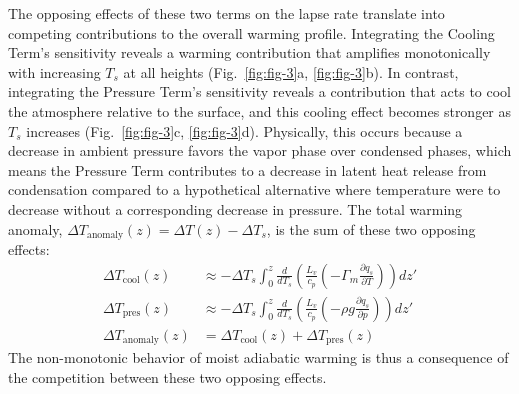 \documentclass{ametsocV6.1}
\begin{document}
The opposing effects of these two terms on the lapse rate translate into competing contributions to the overall warming profile. Integrating the Cooling Term's sensitivity reveals a warming contribution that amplifies monotonically with increasing $T_s$ at all heights (Fig.~\ref{fig:fig-3}a, \ref{fig:fig-3}b). In contrast, integrating the Pressure Term's sensitivity reveals a contribution that acts to cool the atmosphere relative to the surface, and this cooling effect becomes stronger as $T_s$ increases (Fig.~\ref{fig:fig-3}c, \ref{fig:fig-3}d). Physically, this occurs because a decrease in ambient pressure favors the vapor phase over condensed phases, which means the Pressure Term contributes to a decrease in latent heat release from condensation compared to a hypothetical alternative where temperature were to decrease without a corresponding decrease in pressure. The total warming anomaly, $\Delta T_{\text{anomaly}}(z)=\Delta T(z)-\Delta T_s$, is the sum of these two opposing effects:
\begin{align}
\Delta T_{\text{cool}}(z) &\approx - \Delta T_s \int_0^z \frac{d}{dT_s}\left(\frac{L_v}{c_p}\left(-\Gamma_m \frac{\partial q_s}{\partial T}\right)\right) dz' \label{eq:delta_t_cool} \\
\Delta T_{\text{pres}}(z) &\approx - \Delta T_s \int_0^z \frac{d}{dT_s}\left(\frac{L_v}{c_p}\left(-\rho g \frac{\partial q_s}{\partial p}\right)\right) dz' \label{eq:delta_t_pres} \\
\Delta T_{\text{anomaly}}(z) &= \Delta T_{\text{cool}}(z) + \Delta T_{\text{pres}}(z) \label{eq:delta_t_anomaly}
\end{align}
The non-monotonic behavior of moist adiabatic warming is thus a consequence of the competition between these two opposing effects.
\end{document}
